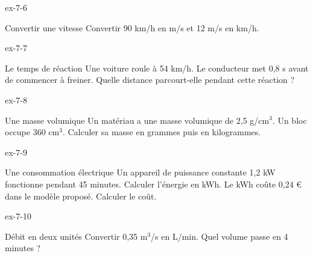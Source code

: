 \clearpage{}
\begin{blocLivre}{ex-7-6}\begin{exercice}[2]{Convertir une vitesse}
Convertir 90 km/h en m/s et 12 m/s en km/h.
\end{exercice}\end{blocLivre}
\begin{blocLivre}{ex-7-7}\begin{exercice}[2]{Le temps de réaction}
Une voiture roule à 54 km/h. Le conducteur met 0,8 s avant de commencer à freiner. Quelle distance parcourt-elle pendant cette réaction ?
\end{exercice}\end{blocLivre}
\begin{blocLivre}{ex-7-8}\begin{exercice}[2]{Une masse volumique}
Un matériau a une masse volumique de 2,5 g/cm$^3$. Un bloc occupe 360 cm$^3$. Calculer sa masse en grammes puis en kilogrammes.
\end{exercice}\end{blocLivre}
\begin{blocLivre}{ex-7-9}\begin{exercice}[2]{Une consommation électrique}
Un appareil de puissance constante 1,2 kW fonctionne pendant 45 minutes. Calculer l’énergie en kWh. Le kWh coûte 0,24 € dans le modèle proposé. Calculer le coût.
\end{exercice}\end{blocLivre}
\begin{blocLivre}{ex-7-10}\begin{exercice}[2]{Débit en deux unités}
Convertir 0,35 m$^3$/s en L/min. Quel volume passe en 4 minutes ?
\end{exercice}\end{blocLivre}

